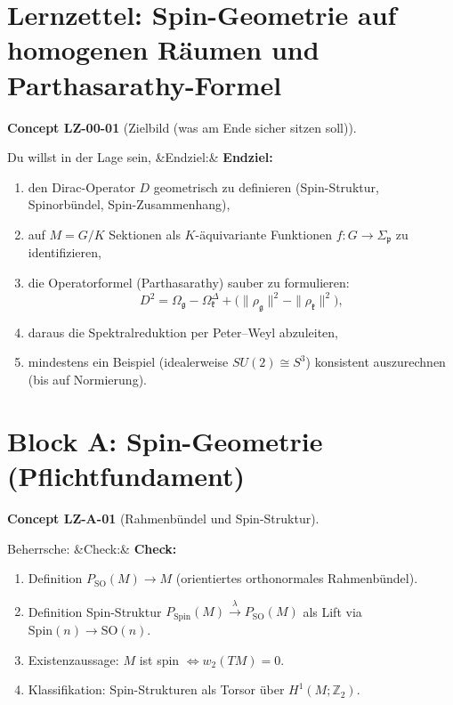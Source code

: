 \documentclass[10pt, letterpaper]{article}
\newcommand{\Z}{\mathbb{Z}}
\newcommand{\SO}{\mathrm{SO}}
\newcommand{\Spin}{\mathrm{Spin}}
\newenvironment{romanenum}[1][]
  {%
    \ifx&#1&
    \else
      \textbf{#1}\quad
    \fi
    \begin{enumerate}[label=\roman*)]
  }
  {%
    \end{enumerate}%
  }
\newcommand{\CustomHeading}[3]{%
  \par\medskip\noindent%
  \textbf{#1 #2} \textnormal{(#3)}.\enskip%
}
\newenvironment{CONC}[2]{\begin{unitbox}\CustomHeading{Concept}{#1}{#2}}{\end{unitbox}}
\begin{document}
\pagebreak


\section*{Lernzettel: Spin-Geometrie auf homogenen R\"aumen und Parthasarathy-Formel}

\begin{CONC}{LZ-00-01}{Zielbild (was am Ende sicher sitzen soll)}
Du willst in der Lage sein,
\begin{romanenum}[Endziel:]
\item den Dirac-Operator $D$ geometrisch zu definieren (Spin-Struktur, Spinorb\"undel, Spin-Zusammenhang),
\item auf $M=G/K$ Sektionen als $K$-\"aquivariante Funktionen $f:G\to\Sigma_{\mathfrak p}$ zu identifizieren,
\item die Operatorformel (Parthasarathy) sauber zu formulieren:
\[
D^{2}=\Omega_{\mathfrak g}-\Omega_{\mathfrak k}^{\Delta}+\big(\|\rho_{\mathfrak g}\|^{2}-\|\rho_{\mathfrak k}\|^{2}\big),
\]
\item daraus die Spektralreduktion per Peter--Weyl abzuleiten,
\item mindestens ein Beispiel (idealerweise $SU(2)\cong S^{3}$) konsistent auszurechnen (bis auf Normierung).
\end{romanenum}
\end{CONC}

\section{Block A: Spin-Geometrie (Pflichtfundament)}

\begin{CONC}{LZ-A-01}{Rahmenb\"undel und Spin-Struktur}
Beherrsche:
\begin{romanenum}[Check:]
\item Definition $P_{\SO}(M)\to M$ (orientiertes orthonormales Rahmenb\"undel).
\item Definition Spin-Struktur $P_{\Spin}(M)\xrightarrow{\lambda}P_{\SO}(M)$ als Lift via $\Spin(n)\to\SO(n)$.
\item Existenzaussage: $M$ ist spin $\Longleftrightarrow w_2(TM)=0$.
\item Klassifikation: Spin-Strukturen als Torsor \"uber $H^1(M;\Z_2)$.
\end{romanenum}
\end{CONC}
\end{document}
